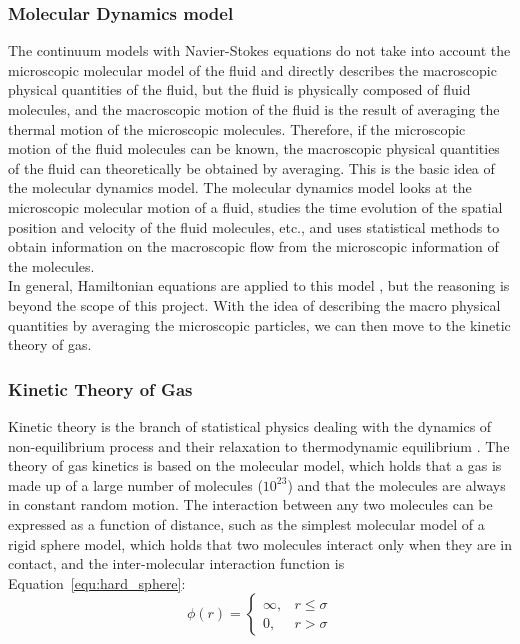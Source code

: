 \subsubsection{Molecular Dynamics model} \label{sec:HE}
The continuum models with Navier-Stokes equations do not take into account the microscopic molecular model of the fluid and directly describes the macroscopic physical quantities of the fluid, but the fluid is physically composed of fluid molecules, and the macroscopic motion of the fluid is the result of averaging the thermal motion of the microscopic molecules. Therefore, if the microscopic motion of the fluid molecules can be known, the macroscopic physical quantities of the fluid can theoretically be obtained by averaging. This is the basic idea of the molecular dynamics model. The molecular dynamics model looks at the microscopic molecular motion of a fluid, studies the time evolution of the spatial position and velocity of the fluid molecules, etc., and uses statistical methods to obtain information on the macroscopic flow from the microscopic information of the molecules.\\

In general, Hamiltonian equations are applied to this model \cite{salmon1988hamiltonian}, but the reasoning is beyond the scope of this project. With the idea of describing the macro physical quantities by averaging the microscopic particles, we can then move to the kinetic theory of gas.

\subsubsection{Kinetic Theory of Gas}\label{sec:BE}
Kinetic theory is the branch of statistical physics dealing with the dynamics of non-equilibrium process and their relaxation to thermodynamic equilibrium \cite{succi2001lattice}. The theory of gas kinetics is based on the molecular model, which holds that a gas is made up of a large number of molecules ($10^{23}$) and that the molecules are always in constant random motion. The interaction between any two molecules can be expressed as a function of distance, such as the simplest molecular model of a rigid sphere model, which holds that two molecules interact only when they are in contact, and the inter-molecular interaction function is Equation~\ref{equ:hard_sphere}:\\

\begin{equation}
\label{equ:hard_sphere}
\phi  (r) = \left\{\begin{matrix}
\infty, & r \leqslant \sigma \\ 
0, & r > \sigma
\end{matrix}\right.
\end{equation}


